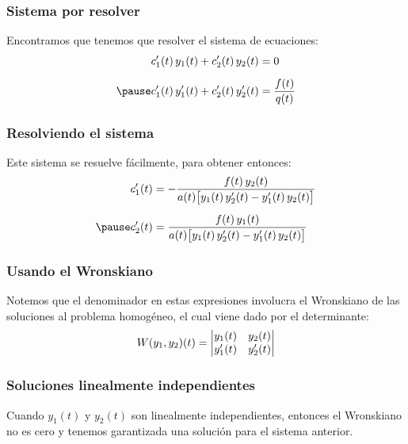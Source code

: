 \documentclass[12pt]{beamer}
\begin{document}
\begin{frame}
\frametitle{Sistema por resolver}
Encontramos que tenemos que resolver el sistema de ecuaciones:
\pause
\begin{eqnarray}
\begin{aligned}[b]
\pderivada{c}_{1} (t) \, y_{1} (t) + \pderivada{c}_{2} (t) \, y_{2} (t) &= 0 \\[0.5em] \pause
\pderivada{c}_{1} (t) \, \pderivada{y}_{1} (t) + \pderivada{c}_{2} (t) \, \pderivada{y}_{2} (t) &= \dfrac{f (t)}{q (t)}
\end{aligned}
\label{eq:ecuacion_07_06}
\end{eqnarray}
\end{frame}

\begin{frame}
\frametitle{Resolviendo el sistema}
Este sistema se resuelve fácilmente, para obtener entonces:
\pause
\begin{eqnarray}
\begin{aligned}[b]
\pderivada{c}_{1} (t) &= - \dfrac{f (t) \, y_{2} (t)}{a (t) \big[ y_{1} (t) \, \pderivada{y}_{2} (t)  - \pderivada{y}_{1} (t) \, y_{2} (t) \big]} \\[0.5em] \pause
\pderivada{c}_{2} (t) &= \dfrac{f (t) \, y_{1} (t)}{a (t) \big[ y_{1} (t) \, \pderivada{y}_{2} (t)  - \pderivada{y}_{1} (t) \, y_{2} (t) \big]}
\end{aligned}
\label{eq:ecuacion_07_07}
\end{eqnarray}
\end{frame}

\begin{frame}
\frametitle{Usando el Wronskiano}
Notemos que el denominador en estas expresiones involucra el Wronskiano de las soluciones al problema homogéneo, el cual viene dado por el determinante:
\pause
\begin{align*}
W (y_{1}, y_{2}) (t) = \mqty|
y_{1} (t) & y_{2} (t) \\
\pderivada{y}_{1} (t) & \pderivada{y}_{2} (t) |
\end{align*}
\end{frame}

\begin{frame}
\frametitle{Soluciones linealmente independientes}
Cuando $y_{1} (t)$ y $y_{2} (t)$ son linealmente independientes, \pause entonces el Wronskiano no es cero y tenemos garantizada una solución para el sistema anterior.
\end{frame}
\end{document}
